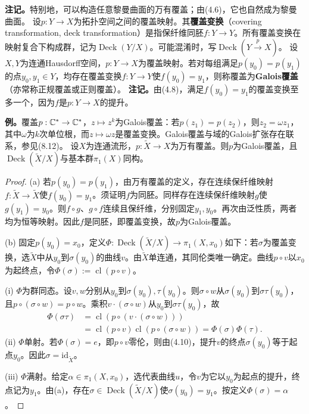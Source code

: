 \textbf{注记。}特别地，可以构造任意黎曼曲面的万有覆盖；由(4.6)，它也自然成为黎曼曲面。
设$p:Y\to X$为拓扑空间之间的覆盖映射。其\textbf{覆盖变换}（covering transformation, deck transformation）是指保纤维同胚$f:Y\to Y$。所有覆盖变换在映射复合下构成群，记为$\operatorname{Deck}(Y/X)$。可能混淆时，写$\operatorname{Deck}(Y\xrightarrow{p}X)$。
设$X,Y$为连通Hausdorff空间，$p:Y\to X$为覆盖映射。若对每组满足$p(y_0)=p(y_1)$的点$y_0,y_1\in Y$，均存在覆盖变换$f:Y\to Y$使$f(y_0)=y_1$，则称覆盖为\textbf{Galois覆盖}（亦常称正规覆盖或正则覆盖）。
\textbf{注记。}由(4.8)，满足$f(y_0)=y_1$的覆盖变换至多一个，因为$f$是$p:Y\to X$的提升。

\textbf{例。}覆盖$p:\mathbb C^*\to\mathbb C^*$，$z\mapsto z^k$为Galois覆盖：若$p(z_1)=p(z_2)$，则$z_2=\omega z_1$，其中$\omega$为$k$次单位根，而$z\mapsto\omega z$是覆盖变换。Galois覆盖与域的Galois扩张存在联系，参见(8.12)。
设$X$为连通流形，$p:\widetilde X\to X$为万有覆盖。则$p$为Galois覆盖，且$\operatorname{Deck}(\widetilde X/X)$与基本群$\pi_1(X)$同构。
\begin{proof}
(a) 若$p(y_0)=p(y_1)$，由万有覆盖的定义，存在连续保纤维映射$f:\widetilde X\to\widetilde X$使$f(y_0)=y_1$。须证明$f$为同胚。同样存在连续保纤维映射$g$使$g(y_1)=y_0$。则$f\circ g$、$g\circ f$连续且保纤维，分别固定$y_1,y_0$。再次由泛性质，两者均为恒等映射。因此$f$是同胚，即覆盖变换，故$p$为Galois覆盖。

(b) 固定$p(y_0)=x_0$，定义$\Phi:\operatorname{Deck}(\widetilde X/X)\to\pi_1(X,x_0)$如下：若$\sigma$为覆盖变换，选$\widetilde X$中从$y_0$到$\sigma(y_0)$的曲线$v$。由$\widetilde X$单连通，其同伦类唯一确定。曲线$p\circ v$以$x_0$为起终点，令$\Phi(\sigma):=\operatorname{cl}(p\circ v)$。

(i) $\Phi$为群同态。设$v,w$分别从$y_0$到$\sigma(y_0),\tau(y_0)$。则$\sigma\circ w$从$\sigma(y_0)$到$\sigma\tau(y_0)$，且$p\circ(\sigma\circ w)=p\circ w$。乘积$v\cdot(\sigma\circ w)$从$y_0$到$\sigma\tau(y_0)$，故
\begin{align*}
\Phi(\sigma\tau)&=\operatorname{cl}(p\circ(v\cdot(\sigma\circ w)))\\
&=\operatorname{cl}(p\circ v)\operatorname{cl}(p\circ(\sigma\circ w))
=\Phi(\sigma)\Phi(\tau).
\end{align*}
(ii) $\Phi$单射。若$\Phi(\sigma)=e$，即$p\circ v$零伦，则由(4.10)，提升$v$的终点$\sigma(y_0)$等于起点$y_0$。因此$\sigma=\mathrm{id}_{\widetilde X}$。

(iii) $\Phi$满射。给定$\alpha\in\pi_1(X,x_0)$，选代表曲线$u$，令$v$为它以$y_0$为起点的提升，终点记为$y_1$。由(a)，存在$\sigma\in\operatorname{Deck}(\widetilde X/X)$使$\sigma(y_0)=y_1$。按定义$\Phi(\sigma)=\alpha$。
\end{proof}
